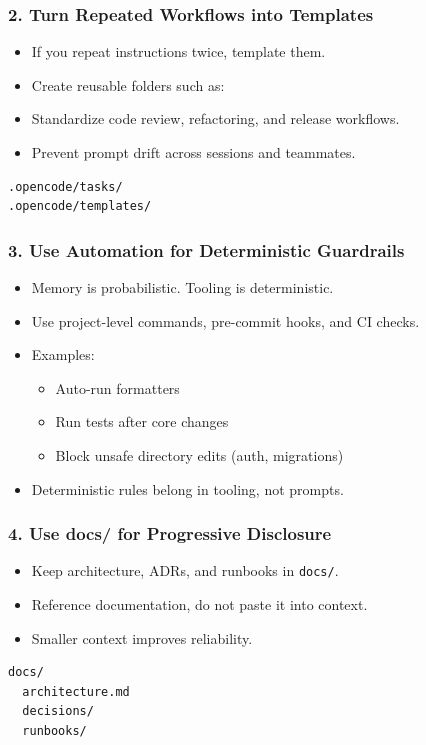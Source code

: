 \begin{frame}[fragile]\frametitle{2. Turn Repeated Workflows into Templates}
  \begin{itemize}
    \item If you repeat instructions twice, template them.
    \item Create reusable folders such as:
    \item Standardize code review, refactoring, and release workflows.
    \item Prevent prompt drift across sessions and teammates.
  \end{itemize}

\begin{lstlisting}
.opencode/tasks/
.opencode/templates/
\end{lstlisting}
\end{frame}

\begin{frame}[fragile]\frametitle{3. Use Automation for Deterministic Guardrails}
  \begin{itemize}
    \item Memory is probabilistic. Tooling is deterministic.
    \item Use project-level commands, pre-commit hooks, and CI checks.
    \item Examples:
    \begin{itemize}
        \item Auto-run formatters
        \item Run tests after core changes
        \item Block unsafe directory edits (auth, migrations)
    \end{itemize}
    \item Deterministic rules belong in tooling, not prompts.
  \end{itemize}
\end{frame}

\begin{frame}[fragile]\frametitle{4. Use docs/ for Progressive Disclosure}
  \begin{itemize}
    \item Keep architecture, ADRs, and runbooks in \texttt{docs/}.
    \item Reference documentation, do not paste it into context.
    \item Smaller context improves reliability.
  \end{itemize}

\begin{lstlisting}
docs/
  architecture.md
  decisions/
  runbooks/
\end{lstlisting}
\end{frame}

